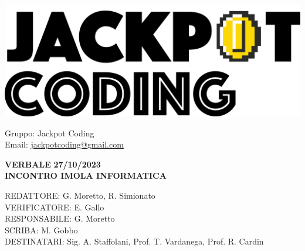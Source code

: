\documentclass[5pt]{article}
\begin{document}
\begin{minipage}[t]{0.50\textwidth}
    \begin{flushleft}
        \hspace{10pt}
        \includegraphics[scale=0.65]{jackpot-logo.png} 
    \end{flushleft}
\end{minipage}
\hspace{-60pt} %
\begin{flushright}
    \begin{minipage}[t]{0.50\textwidth}
        \begin{flushright}
            Gruppo: {\Large Jackpot Coding}\\
            Email: \href{mailto:jackpotcoding@gmail.com}{jackpotcoding@gmail.com}
        \end{flushright}
    \end{minipage}
\end{flushright}

\vspace{24pt}

\begin{center}
    \textbf{\large VERBALE }
    \textbf{\large 27/10/2023} \\
    \textbf{\LARGE INCONTRO IMOLA INFORMATICA}
\end{center}

\vspace{13pt}

\begin{flushleft}
    \begin{spacing}{1.5}
        REDATTORE:  G. Moretto, R. Simionato\\%
        VERIFICATORE:   E. Gallo\\%
        RESPONSABILE:   G. Moretto\\%
        \vspace{7pt}
        SCRIBA: M. Gobbo\\%
        \vspace{7pt}
        DESTINATARI:  Sig. A. Staffolani, Prof. T. Vardanega, Prof. R. Cardin\\%
    \end{spacing}
\end{flushleft}
\end{document}
